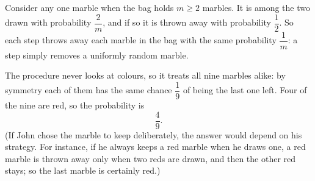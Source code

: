 Consider any one marble when the bag holds $m\ge2$ marbles. It is among the two drawn with probability $\dfrac{2}{m}$, and if so it is thrown away with probability $\dfrac{1}{2}$. So each step throws away each marble in the bag with the same probability $\dfrac{1}{m}$: a step simply removes a uniformly random marble.

The procedure never looks at colours, so it treats all nine marbles alike: by symmetry each of them has the same chance $\dfrac{1}{9}$ of being the last one left. Four of the nine are red, so the probability is
\[
\boxed{\dfrac{4}{9}}.
\]
(If John chose the marble to keep deliberately, the answer would depend on his strategy. For instance, if he always keeps a red marble when he draws one, a red marble is thrown away only when two reds are drawn, and then the other red stays; so the last marble is certainly red.)
